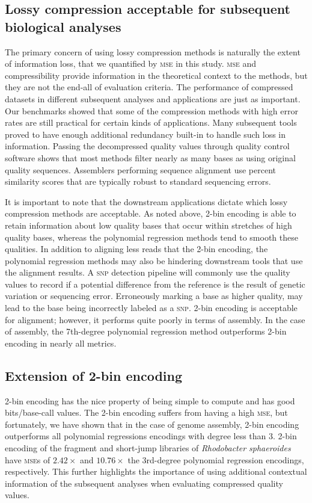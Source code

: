\documentclass{bioinfo}
\begin{document}
\subsection{Lossy compression acceptable for subsequent biological analyses}

The primary concern of using lossy compression methods is naturally
the extent of information loss, that we quantified by \textsc{mse} in
this study. \textsc{mse} and compressibility provide information in
the theoretical context to the methods, but they are not the end-all
of evaluation criteria. The performance of compressed datasets in
different subsequent analyses and applications are just as
important. Our benchmarks showed that some of the compression methods
with high error rates are still practical for certain kinds of
applications. Many subsequent tools proved to have enough additional
redundancy built-in to handle such loss in information. Passing the
decompressed quality values through quality control software shows
that most methods filter nearly as many bases as using original
quality sequences. Assemblers performing sequence alignment use
percent similarity scores that are typically robust to standard
sequencing errors.

It is important to note that the downstream applications dictate
which lossy compression methods are acceptable. As noted
above, 2-bin encoding is able to retain information about low
quality bases that occur within stretches of high quality bases,
whereas the polynomial regression methods tend to smooth these
qualities. In addition to aligning less reads that the 2-bin
encoding, the polynomial regression methods may also be hindering
downstream tools that use the alignment results. A \textsc{snp}
detection pipeline will commonly use the quality values to record if a
potential difference from the reference is the result of genetic
variation or sequencing error.  Erroneously marking a base as higher
quality, may lead to the base being incorrectly labeled as a
\textsc{snp}.  2-bin encoding is acceptable for alignment; however, it
performs quite poorly in terms of assembly. In the case of assembly,
the 7th-degree polynomial regression method outperforms 2-bin encoding
in nearly all metrics.

\subsection{Extension of 2-bin encoding}

2-bin encoding has the nice property of being simple to compute and
has good bits/base-call values. The 2-bin encoding suffers from having
a high \textsc{mse}, but fortunately, we have shown that in the case
of genome assembly, 2-bin encoding outperforms all polynomial
regressions encodings with degree less than 3. 2-bin encoding of the
fragment and short-jump libraries of \textit{Rhodobacter sphaeroides}
have \textsc{mse}s of $2.42\times$ and $10.76\times$ the 3rd-degree
polynomial regression encodings, respectively. This further highlights
the importance of using additional contextual information of the
subsequent analyses when evaluating compressed quality values.
\end{document}
